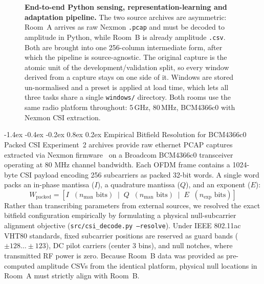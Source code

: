 \documentclass[10pt,a4paper]{article}
\makeatletter
\renewcommand{\subsection}{\@startsection{subsection}{2}{\z@}%
  {-1.4ex \@plus -0.4ex \@minus -0.2ex}%
  {0.8ex \@plus 0.2ex}%
  {\normalfont\normalsize\bfseries\color{secondary}}}
\makeatother
\begin{document}
\begin{figure}[!t]
\caption{\textbf{End-to-end Python sensing, representation-learning and adaptation pipeline.}
  The two source archives are asymmetric: Room~A arrives as raw Nexmon \texttt{.pcap} and must be
  decoded to amplitude in Python, while Room~B is already amplitude \texttt{.csv}. Both are brought
  into one 256-column intermediate form, after which the pipeline is source-agnostic. The original
  capture is the atomic unit of the development/validation split, so every window derived from a
  capture stays on one side of it. Windows are stored un-normalised and a preset is applied at load
  time, which lets all three tasks share a single \texttt{windows/} directory. Both rooms use the
  same radio platform throughout: 5\,GHz, 80\,MHz, BCM4366c0 with Nexmon CSI extraction.}
\label{fig:pipeline_diagram}
\end{figure}

\subsection{Empirical Bitfield Resolution for BCM4366c0 Packed CSI}
Experiment~2 archives provide raw ethernet PCAP captures extracted via Nexmon firmware~\cite{gringoli2019free} on a Broadcom BCM4366c0 transceiver operating at 80 MHz channel bandwidth. Each OFDM frame contains a 1024-byte CSI payload encoding 256 subcarriers as packed 32-bit words. A single word packs an in-phase mantissa ($I$), a quadrature mantissa ($Q$), and an exponent ($E$):
\begin{equation}
    W_{\text{packed}} = \left[ I \;\; (n_{\text{man}}\text{ bits}) \;\;|\;\; Q \;\; (n_{\text{man}}\text{ bits}) \;\;|\;\; E \;\; (n_{\text{exp}}\text{ bits}) \right]
\end{equation}
Rather than transcribing parameters from external sources, we resolved the exact bitfield configuration empirically by formulating a physical null-subcarrier alignment objective (\texttt{src/csi\_decode.py --resolve}). Under IEEE 802.11ac VHT80 standards, fixed subcarrier positions are reserved as guard bands ($\pm 128 \dots \pm 123$), DC pilot carriers (center 3 bins), and null notches, where transmitted RF power is zero. Because Room~B data was provided as pre-computed amplitude CSVs from the identical platform, physical null locations in Room~A must strictly align with Room~B.
\end{document}

